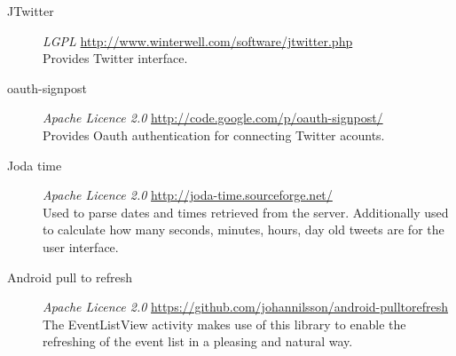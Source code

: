 \begin{description}
    \item[JTwitter] \emph{LGPL} \url{http://www.winterwell.com/software/jtwitter.php} \hfill \\
        Provides Twitter interface.
    \item[oauth-signpost] \emph{Apache Licence 2.0} \url{http://code.google.com/p/oauth-signpost/} \hfill \\
        Provides Oauth authentication for connecting Twitter acounts.
    \item[Joda time] \emph{Apache Licence 2.0} \url{http://joda-time.sourceforge.net/} \hfill \\
        Used to parse dates and times retrieved from the server. Additionally
        used to calculate how many seconds, minutes, hours, day old tweets are
        for the user interface.
    \item[Android pull to refresh] \emph{Apache Licence 2.0} \url{https://github.com/johannilsson/android-pulltorefresh} \hfill \\
        The EventListView activity makes use of this library to enable the
        refreshing of the event list in a pleasing and natural way.
\end{description}
